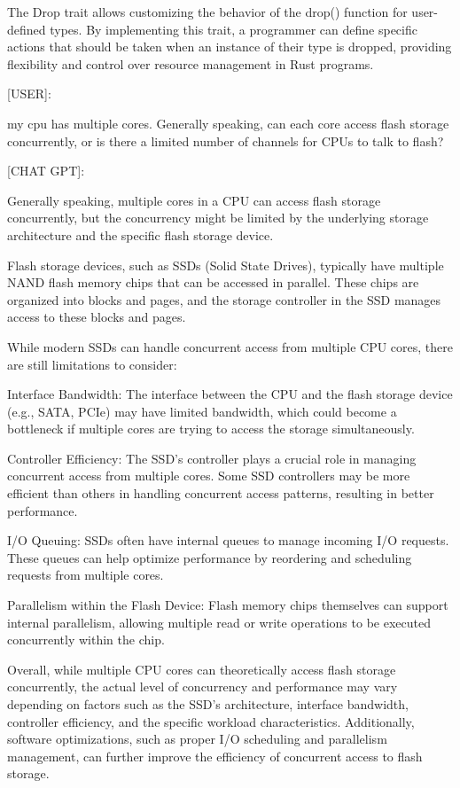 The Drop trait allows customizing the behavior of the drop() function for user-defined types. By implementing this trait, a programmer can define specific actions that should be taken when an instance of their type is dropped, providing flexibility and control over resource management in Rust programs.

[USER]:

my cpu has multiple cores. Generally speaking, can each core access flash storage concurrently, or is there a limited number of channels for CPUs to talk to flash?

[CHAT GPT]:

Generally speaking, multiple cores in a CPU can access flash storage concurrently, but the concurrency might be limited by the underlying storage architecture and the specific flash storage device.

Flash storage devices, such as SSDs (Solid State Drives), typically have multiple NAND flash memory chips that can be accessed in parallel. These chips are organized into blocks and pages, and the storage controller in the SSD manages access to these blocks and pages.

While modern SSDs can handle concurrent access from multiple CPU cores, there are still limitations to consider:

    Interface Bandwidth: The interface between the CPU and the flash storage device (e.g., SATA, PCIe) may have limited bandwidth, which could become a bottleneck if multiple cores are trying to access the storage simultaneously.

    Controller Efficiency: The SSD's controller plays a crucial role in managing concurrent access from multiple cores. Some SSD controllers may be more efficient than others in handling concurrent access patterns, resulting in better performance.

    I/O Queuing: SSDs often have internal queues to manage incoming I/O requests. These queues can help optimize performance by reordering and scheduling requests from multiple cores.

    Parallelism within the Flash Device: Flash memory chips themselves can support internal parallelism, allowing multiple read or write operations to be executed concurrently within the chip.

Overall, while multiple CPU cores can theoretically access flash storage concurrently, the actual level of concurrency and performance may vary depending on factors such as the SSD's architecture, interface bandwidth, controller efficiency, and the specific workload characteristics. Additionally, software optimizations, such as proper I/O scheduling and parallelism management, can further improve the efficiency of concurrent access to flash storage.

